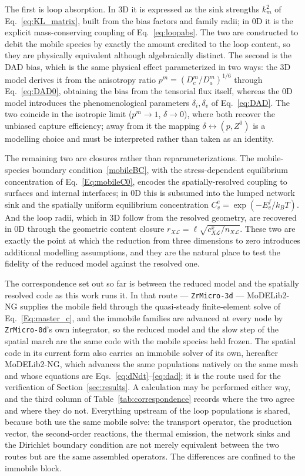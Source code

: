 \documentclass{article}
\newcommand{\ZrM}{\texttt{ZrMicro-3d}}
\newcommand{\ZrOd}{\texttt{ZrMicro-0d}}
\newcommand{\MoDNG}{\textsf{MoDELib2-NG}}
\begin{document}
The first is loop absorption. In $3$D it is expressed as the sink strengths $k_m^2$
of Eq.~\eqref{eq:KL_matrix}, built from the bias factors and family radii; in $0$D
it is the explicit mass-conserving coupling of Eq.~\eqref{eq:loopabs}. The two are
constructed to debit the mobile species by exactly the amount credited to the loop
content, so they are physically equivalent although algebraically distinct. The
second is the DAD bias, which is the same physical effect parameterized in two ways:
the $3$D model derives it from the anisotropy ratio $p^m=(D_c^m/D_a^m)^{1/6}$
through Eq.~\eqref{eq:DAD0}, obtaining the bias from the tensorial flux itself,
whereas the $0$D model introduces the phenomenological parameters $\delta_i,\delta_v$
of Eq.~\eqref{eq:DAD}. The two coincide in the isotropic limit ($p^m\to1$,
$\delta\to0$), where both recover the unbiased capture efficiency; away from it the
mapping $\delta\leftrightarrow(p,Z^0)$ is a modelling choice and must be interpreted
rather than taken as an identity.

The remaining two are closures rather than reparameterizations. The mobile-species
boundary condition~\eqref{mobileBC}, with the stress-dependent equilibrium
concentration of Eq.~\eqref{Eq:mobileC0}, encodes the spatially-resolved coupling to
surfaces and internal interfaces; in $0$D this is subsumed into the lumped network
sink and the spatially uniform equilibrium concentration
$C_v^e=\exp(-E_v^f/k_BT)$. And the loop radii, which in $3$D follow from the
resolved geometry, are recovered in $0$D through the geometric content closure
$r_{X\mathcal L}=\ell\sqrt{c^x_{X\mathcal L}/n_{X\mathcal L}}$. These two are
exactly the point at which the reduction from three dimensions to zero introduces
additional modelling assumptions, and they are the natural place to test the
fidelity of the reduced model against the resolved one.

The correspondence set out so far is between the reduced model and the spatially
resolved code as this work runs it. In that route --- {\ZrM} --- {\MoDNG} supplies
the mobile field through the quasi-steady finite-element solve of
Eq.~\eqref{Eq:master_c}, and the immobile families are advanced at every node by
{\ZrOd}'s own integrator, so the reduced model and the slow step of the spatial
march are the same code with the mobile species held frozen. The spatial code in
its current form also carries an immobile solver of its own, hereafter {\MoDNG},
which advances the same populations natively on the same mesh and whose equations
are Eqs.~\eqref{eq:dNdt}--\eqref{eq:dad}; it is the route used for the
verification of Section~\ref{sec:results}. A calculation may be performed either
way, and the third column of Table~\ref{tab:correspondence} records where the two
agree and where they do not. Everything upstream of the loop populations is
shared, because both use the same mobile solve: the transport operator, the
production vector, the second-order reactions, the thermal emission, the network
sinks and the Dirichlet boundary condition are not merely equivalent between the
two routes but are the same assembled operators. The differences are confined to
the immobile block.
\end{document}
